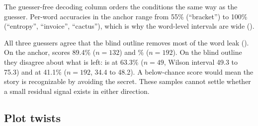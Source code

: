 The guesser-free decoding column orders the conditions the same way as the guesser.
Per-word accuracies in the anchor range from 55\% (``bracket'') to 100\% (``entropy'', ``invoice'', ``cactus''), which is why the word-level intervals are wide ().

All three guessers agree that the blind outline removes most of the word leak ().
On the anchor, \nemotron scores 89.4\% ($n=132$) and \% ($n=192$).
On the blind outline they disagree about what is left: \nemotron is at 63.3\% ($n=49$, Wilson interval 49.3 to 75.3) and \gemmabig at 41.1\% ($n=192$, 34.4 to 48.2).
A below-chance score would mean the story is recognizable by avoiding the secret.
These samples cannot settle whether a small residual signal exists in either direction.

\subsection{Plot twists}
\label{sec:exp2}

\begin{table}[t]
    \centering
    \caption{Experiment 2, plot twists, \gemma guesser. The guesser answers ``1'' in about 90\% of trials, so only order-cancelled accuracy is informative. 1,152 discrimination trials per condition with the hide instruction, 576 without, and 288 detection trials. Lowest discrimination per regime in {\bf bold}.}
    \label{tab:exp2}
\end{table}

